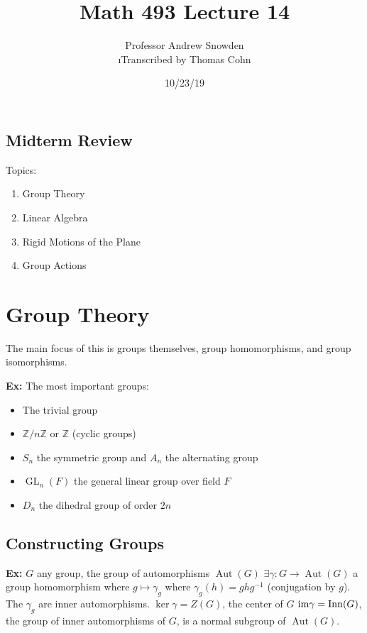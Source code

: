 \documentclass[10pt,letterpaper]{article}
\author{Professor Andrew Snowden\\ \small\i{Transcribed by Thomas Cohn}}
\title{Math 493 Lecture 14}
\date{10/23/19} %
\newcommand{\n}{\hfill\break}
\newcommand{\hangblock}[2]{\par\noindent\settowidth{\hangindent}{\textbf{#1: }}\textbf{#1: }\!\!\!#2}
\newcommand{\ex}[1]{\hangblock{Ex}{#1}}
\newcommand{\integers}{\mathbb{Z}}
\newcommand{\Z}{\integers}
\newcommand{\inv}{^{-1}}
\newcommand{\im}{\textrm{\textnormal{im}}}
\DeclareMathOperator{\GL}{GL}
\DeclareMathOperator{\Aut}{Aut}
\begin{document}
\maketitle
\setlength\RaggedRightParindent{\parindent}
\RaggedRight

\renewcommand{\thesection}{\Roman{section}} 

\subsection*{Midterm Review}

\par\noindent
Topics:
\begin{enumerate}
	\item Group Theory
	\item Linear Algebra
	\item Rigid Motions of the Plane
	\item Group Actions
\end{enumerate}

\section{Group Theory}

\par\noindent
The main focus of this is groups themselves, group homomorphisms, and group isomorphisms.\n

\ex{
	The most important groups:
	\begin{itemize}[leftmargin=3\parindent]
		\item The trivial group
		\item $\Z/n\Z$ or $\Z$ (cyclic groups)
		\item $S_{n}$ the symmetric group and $A_{n}$ the alternating group
		\item $\GL_{n}(F)$ the general linear group over field $F$
		\item $D_{n}$ the dihedral group of order $2n$
	\end{itemize}
}

\subsection*{Constructing Groups}

\ex{
	$G$ any group, the group of automorphisms $\Aut(G)$\n
	$\exists\gamma:G\to\Aut(G)$ a group homomorphism where $g\mapsto\gamma_{g}$ where $\gamma_{g}(h)=ghg\inv$ (conjugation by $g$). The $\gamma_{g}$ are inner automorphisms.\n
	$\ker\gamma=Z(G)$, the center of $G$\n
	$\im\gamma=\operatorname{Inn}(G)$, the group of inner automorphisms of $G$, is a normal subgroup of $\Aut(G)$.\n
}
\end{document}
